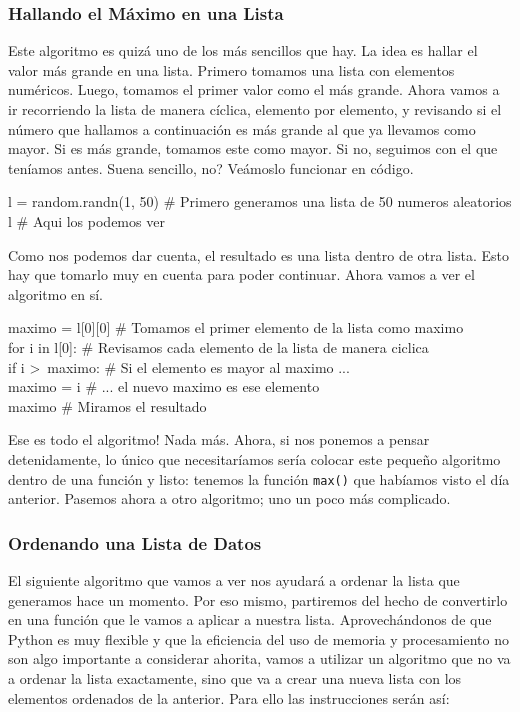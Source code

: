 \documentclass[10pt,letterpaper]{article}
\newcommand{\inlinecode}[1]{
\colorbox{light-gray}{\texttt{#1}}
}
\newenvironment{Code}
{
\begin{lrbox}{\selvestebox}%
\begin{minipage}{\dimexpr\columnwidth-2\fboxsep\relax}
\fontfamily{\ttdefault}\selectfont
}
{\end{minipage}\end{lrbox}%
\begin{center}
\colorbox{light-gray}{\usebox{\selvestebox}}
\end{center}
}
\begin{document}
\subsubsection{Hallando el M\'aximo en una Lista}
Este algoritmo es quiz\'a uno de los m\'as sencillos que hay. La idea es hallar el valor m\'as grande en una lista. Primero tomamos una lista con elementos num\'ericos. Luego, tomamos el primer valor como el m\'as grande. Ahora vamos a ir recorriendo la lista de manera c\'iclica, elemento por elemento, y revisando si el n\'umero que hallamos a continuaci\'on es m\'as grande al que ya llevamos como mayor. Si es m\'as grande, tomamos este como mayor. Si no, seguimos con el que ten\'iamos antes. Suena sencillo, no? Ve\'amoslo funcionar en c\'odigo.

\begin{small}
\begin{Code}
l = random.randn(1, 50) \# Primero generamos una lista de 50 numeros aleatorios\\
l \# Aqui los podemos ver
\end{Code}
\end{small}

Como nos podemos dar cuenta, el resultado es una lista dentro de otra lista. Esto hay que tomarlo muy en cuenta para poder continuar. Ahora vamos a ver el algoritmo en s\'i.

\begin{small}
\begin{Code}
maximo = l[0][0] \# Tomamos el primer elemento de la lista como maximo\\
for i in l[0]: \# Revisamos cada elemento de la lista de manera ciclica\\
\hspace*{4mm} if i >\ maximo: \# Si el elemento es mayor al maximo ...\\
\hspace*{12mm} maximo = i \# ... el nuevo maximo es ese elemento\\
maximo \# Miramos el resultado
\end{Code}
\end{small}

Ese es todo el algoritmo! Nada m\'as. Ahora, si nos ponemos a pensar detenidamente, lo \'unico que necesitar\'iamos ser\'ia colocar este peque\~no algoritmo dentro de una funci\'on y listo: tenemos la funci\'on \inlinecode{max()} que hab\'iamos visto el d\'ia anterior. Pasemos ahora a otro algoritmo; uno un poco m\'as complicado.

\subsubsection{Ordenando una Lista de Datos}
El siguiente algoritmo que vamos a ver nos ayudar\'a a ordenar la lista que generamos hace un momento. Por eso mismo, partiremos del hecho de convertirlo en una funci\'on que le vamos a aplicar a nuestra lista. Aprovech\'andonos de que Python es muy flexible y que la eficiencia del uso de memoria y procesamiento no son algo importante a considerar ahorita, vamos a utilizar un algoritmo que no va a ordenar la lista exactamente, sino que va a crear una nueva lista con los elementos ordenados de la anterior. Para ello las instrucciones ser\'an as\'i:
\end{document}
